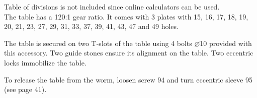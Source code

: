 \begin{notebox}
    Table of divisions is not included since online calculators can be used.\\
    The table has a 120:1 gear ratio.
    It comes with 3 plates with 15, 16, 17, 18, 19, 20, 21, 23, 27, 29, 31, 33, 37, 39, 41, 43, 47 and 49 holes.
\end{notebox}

The table is secured on two T-slots of the table using 4 bolts $\varnothing$10 provided with this accessory.
Two guide stones ensure its alignment on the table. Two eccentric locks immobilize the table.

To release the table from the worm, loosen screw 94 and turn eccentric sleeve 95 (see page 41). %

